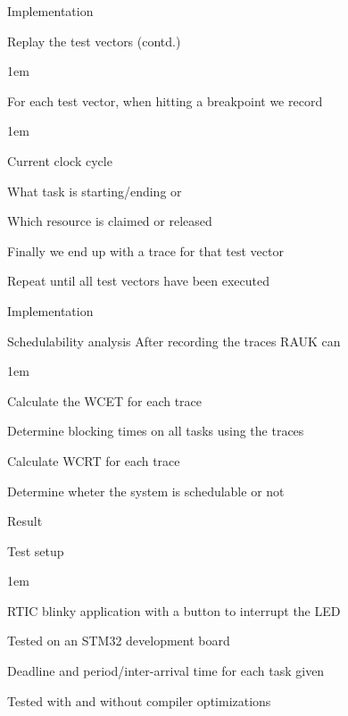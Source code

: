\begin{frame}{Implementation}
    \begin{block}{Replay the test vectors (contd.)}
        \begin{itemize-size}{1em}
            \item For each test vector, when hitting a breakpoint we record
            \begin{itemize-size}{1em}
                \item Current clock cycle
                \item What task is starting/ending or
                \item Which resource is claimed or released
            \end{itemize-size}
            \item Finally we end up with a trace for that test vector
            \item Repeat until all test vectors have been executed
        \end{itemize-size}  
    \end{block}
\end{frame}


\begin{frame}{Implementation}
    \begin{block}{Schedulability analysis}
        After recording the traces RAUK can
        \begin{itemize-size}{1em}
            \vspace{0.5em}
            \item Calculate the WCET for each trace
            \item Determine blocking times on all tasks using the traces
            \item Calculate WCRT for each trace
            \item Determine wheter the system is schedulable or not
        \end{itemize-size}  
    \end{block}
\end{frame}

\begin{frame}{Result}
    \begin{block}{Test setup}
        \begin{itemize-size}{1em}
            \item RTIC blinky application with a button to interrupt the LED
            \item Tested on an STM32 development board
            \item Deadline and period/inter-arrival time for each
            task given
            \item Tested with and without compiler optimizations
        \end{itemize-size}
    \end{block}
\end{frame}

